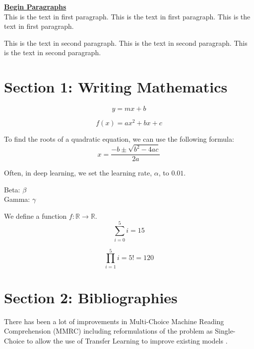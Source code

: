 \documentclass[12pt]{article}
\begin{document}
\underline{\textbf{Begin Paragraphs}} \\
This is the text in first paragraph. This is the text in first 
paragraph. This is the text in first paragraph. \par
This is the text in second paragraph. This is the text in second 
paragraph. This is the text in second paragraph.


\newpage


\section{Section 1: Writing Mathematics}
\begin{equation}
    y = mx + b
\end{equation}

\begin{equation}
    f(x) = ax^2 + bx + c
\end{equation}

To find the roots of a quadratic equation, we can use the following formula:
\begin{equation}
    x = \frac{-b \pm \sqrt{b^2 - 4ac}}{2a}
\end{equation}

Often, in deep learning, we set the learning rate, $\alpha$, to $0.01$. \\

\begin{center}
    Beta: $\beta$ \\
Gamma: $\gamma$
\end{center}

We define a function $f: \mathbb{R} \rightarrow \mathbb{R}$. \\

\begin{equation}
    \sum_{i=0}^5 i = 15
\end{equation}

\begin{equation}
    \prod_{i=1}^5 i = 5! = 120
\end{equation}


\newpage

\section{Section 2: Bibliographies}
There has been a lot of improvements in Multi-Choice Machine Reading Comprehension (MMRC) including reformulations of the problem as Single-Choice to allow the use of Transfer Learning to improve existing models \cite{jiang2020improving}.
\end{document}
